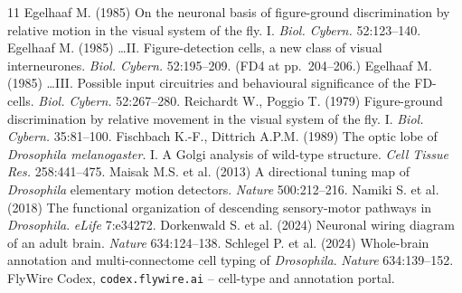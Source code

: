 \documentclass[11pt]{article}
\begin{document}
\begin{thebibliography}{11}
 Egelhaaf M. (1985) On the neuronal basis of figure-ground discrimination by relative motion in the visual system of the fly. I. \textit{Biol. Cybern.} 52:123--140.
 Egelhaaf M. (1985) \ldots II. Figure-detection cells, a new class of visual interneurones. \textit{Biol. Cybern.} 52:195--209. (FD4 at pp.~204--206.)
 Egelhaaf M. (1985) \ldots III. Possible input circuitries and behavioural significance of the FD-cells. \textit{Biol. Cybern.} 52:267--280.
 Reichardt W., Poggio T. (1979) Figure-ground discrimination by relative movement in the visual system of the fly. I. \textit{Biol. Cybern.} 35:81--100.
 Fischbach K.-F., Dittrich A.P.M. (1989) The optic lobe of \textit{Drosophila melanogaster}. I. A Golgi analysis of wild-type structure. \textit{Cell Tissue Res.} 258:441--475.
 Maisak M.S. et al. (2013) A directional tuning map of \textit{Drosophila} elementary motion detectors. \textit{Nature} 500:212--216.
 Namiki S. et al. (2018) The functional organization of descending sensory-motor pathways in \textit{Drosophila}. \textit{eLife} 7:e34272.
 Dorkenwald S. et al. (2024) Neuronal wiring diagram of an adult brain. \textit{Nature} 634:124--138.
 Schlegel P. et al. (2024) Whole-brain annotation and multi-connectome cell typing of \textit{Drosophila}. \textit{Nature} 634:139--152.
 FlyWire Codex, \texttt{codex.flywire.ai} -- cell-type and annotation portal.
\end{thebibliography}
\end{document}
